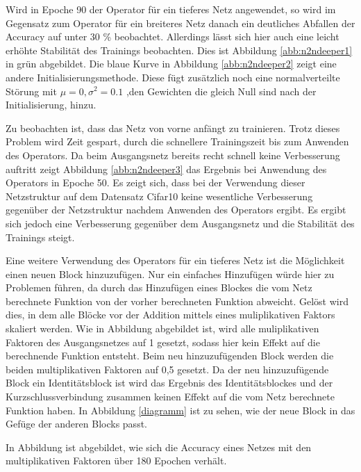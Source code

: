 Wird in Epoche 90 der Operator für ein tieferes Netz angewendet, so wird im Gegensatz zum Operator für ein breiteres Netz danach ein deutliches Abfallen der Accuracy auf unter 30 \% beobachtet. Allerdings lässt sich hier auch eine leicht erhöhte Stabilität des Trainings beobachten.  Dies ist Abbildung \ref{abb:n2ndeeper1} in grün abgebildet. Die blaue Kurve in Abbildung \ref{abb:n2ndeeper2} zeigt eine andere Initialisierungsmethode. Diese fügt zusätzlich noch eine normalverteilte Störung mit $\mu = 0, \sigma^2 = 0.1$ ,den Gewichten die gleich Null sind nach der Initialisierung, hinzu. 

Zu beobachten ist, dass das Netz von vorne anfängt zu trainieren. Trotz dieses Problem wird Zeit gespart, durch die schnellere Trainingszeit bis zum Anwenden des Operators. Da beim Ausgangsnetz bereits recht schnell keine Verbesserung auftritt zeigt Abbildung \ref{abb:n2ndeeper3} das Ergebnis bei Anwendung des Operators in Epoche 50. 
Es zeigt sich, dass bei der Verwendung dieser Netzstruktur auf dem Datensatz Cifar10 keine wesentliche Verbesserung gegenüber der Netzstruktur nachdem Anwenden des Operators ergibt. Es ergibt sich jedoch eine Verbesserung gegenüber dem Ausgangsnetz und die Stabilität des Trainings steigt.



Eine weitere Verwendung des Operators für ein tieferes Netz ist die Möglichkeit einen neuen Block hinzuzufügen. Nur ein einfaches Hinzufügen würde hier zu Problemen führen, da durch das Hinzufügen eines Blockes die vom Netz berechnete Funktion von der vorher berechneten Funktion abweicht. Gelöst wird dies, in dem alle Blöcke vor der Addition mittels eines muliplikativen Faktors skaliert werden. Wie in Abbildung  abgebildet ist, wird alle muliplikativen Faktoren des Ausgangsnetzes auf 1 gesetzt, sodass hier kein Effekt auf die berechnende Funktion entsteht. Beim neu hinzuzufügenden Block werden die beiden multiplikativen Faktoren auf 0,5 gesetzt. Da der neu hinzuzufügende Block ein Identitätsblock ist wird das Ergebnis des Identitätsblockes und der Kurzschlussverbindung zusammen keinen Effekt auf die vom Netz berechnete Funktion haben. In Abbildung \ref{diagramm} ist zu sehen, wie der neue Block in das Gefüge der anderen Blocks passt.


In Abbildung  ist abgebildet, wie sich die Accuracy eines Netzes mit den multiplikativen Faktoren über 180 Epochen verhält.


\begin{figure}
     \centering
     \subfloat[][Diagramm 1]{}     
     \subfloat[][Diagramm 2]{}
     \subfloat[][Diagramm 3]{}
     \caption{}
     \label{abb:diagramm}
\end{figure}


